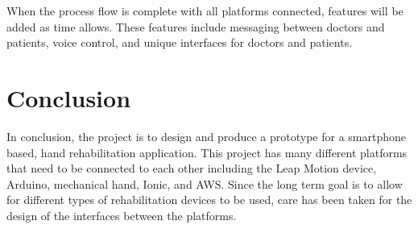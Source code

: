\documentclass[a4paper,10pt]{article}
\begin{document}
            When the process flow is complete with all platforms connected, features will be added as time allows. These features include messaging between doctors and patients, voice control, and unique interfaces for doctors and patients.

\section{Conclusion}

          In conclusion, the project is to design and produce a prototype for a smartphone based, hand rehabilitation application. This project has many different platforms that need to be connected to each other including the Leap Motion device, Arduino, mechanical hand, Ionic, and AWS. Since the long term goal is to allow for different types of rehabilitation devices to be used, care has been taken for the design of the interfaces between the platforms.
\end{document}
